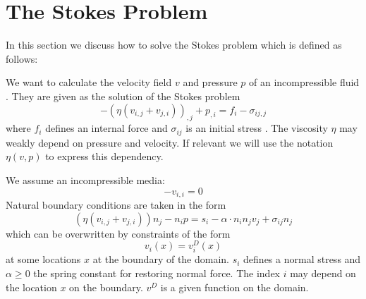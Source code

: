 \section{The Stokes Problem}
\label{STOKES PROBLEM} 
In this section we discuss how to solve the Stokes problem which is defined as follows:

We want to calculate the velocity  field $v$ and pressure $p$ of an incompressible fluid . They are given as the solution of the Stokes problem
\begin{equation}\label{Stokes 1}
-\left(\eta(v_{i,j}+ v_{j,i})\right)_{,j}+p_{,i}=f_{i}-\sigma_{ij,j}
\end{equation}
where  $f_{i}$ defines an internal force  and $\sigma_{ij}$ is an initial stress . The viscosity $\eta$ may weakly depend on pressure and velocity. If relevant we will use the notation $\eta(v,p)$ to express this dependency.

We assume an incompressible media:
\begin{equation}\label{Stokes 2}
-v_{i,i}=0
\end{equation}
Natural boundary conditions are taken in the form 
\begin{equation}\label{Stokes Boundary}
\left(\eta(v_{i,j}+ v_{j,i})\right)n_{j}-n_{i}p=s_{i} - \alpha \cdot n_{i} n_{j} v_{j}+\sigma_{ij} n_{j}
\end{equation}
which can be overwritten by constraints of the form 
\begin{equation}\label{Stokes Boundary0}
v_{i}(x)=v^D_{i}(x)
\end{equation}
at some locations $x$ at the boundary of the domain. $s_{i}$ defines a normal stress and 
$\alpha\ge 0$ the spring constant for restoring normal force.
The index $i$ may depend on the location $x$ on the boundary.
$v^D$ is a given function on the domain.

